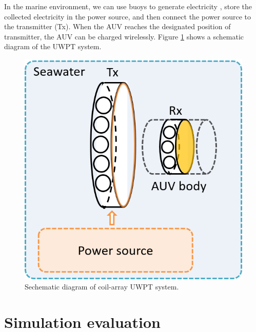 In the marine environment, we can use buoys to generate electricity \cite{Orekan}, store the collected electricity in the power source, and then connect the power source to the transmitter (Tx). When the AUV reaches the designated position of transmitter, the AUV can be charged wirelessly.
Figure \ref{fig:3_coil_array_uwpt} shows a schematic diagram of the UWPT system.
\begin{figure}[!b]
    \centering
    \includegraphics[width=0.5\linewidth]{images/3_coil_array_uwpt.png}
    \caption{Sechematic diagram of coil-array UWPT system.}
    \label{fig:3_coil_array_uwpt}
\end{figure}


\section{Simulation evaluation}


